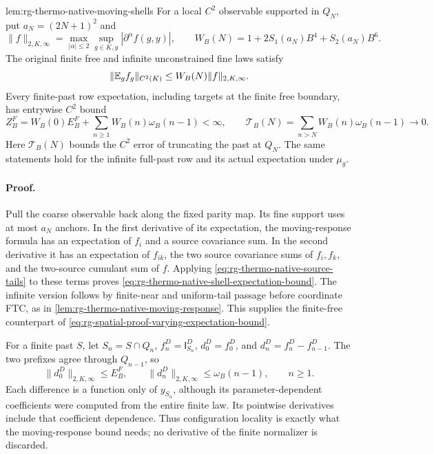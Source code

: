 {lem:rg-thermo-native-moving-shells}
For a local \(C^2\) observable supported in \(Q_N\), put
\(a_N=(2N+1)^2\) and
\begin{equation}
 \|f\|_{2,K,\infty}=\max_{|\alpha|\le2}\sup_{g\in K,y}
                                  |\partial^\alpha f(g,y)|,
 \qquad W_B(N)=1+2S_1(a_N)B^4+S_2(a_N)B^6.
 \label{eq:rg-thermo-native-shell-response-weight}
\end{equation}
The original finite free and infinite unconstrained fine laws satisfy
\begin{equation}
 \|\mathbb E_gf_g\|_{C^2(K)}\le W_B(N)\|f\|_{2,K,\infty}.
 \label{eq:rg-thermo-native-shell-expectation-bound}
\end{equation}
Every finite-past row expectation, including targets at the finite free
boundary, has entrywise \(C^2\) bound
\begin{equation}
 Z_B^F=W_B(0)E_B^F+\sum_{n\ge1}W_B(n)\omega_B(n-1)<\infty,
 \qquad
 \mathcal T_B(N)=\sum_{n>N}W_B(n)\omega_B(n-1)\longrightarrow0.
 \label{eq:rg-thermo-native-shell-tail}
\end{equation}
Here \(\mathcal T_B(N)\) bounds the \(C^2\) error of truncating the
past at \(Q_N\). The same statements hold for the infinite full-past
row and its actual expectation under \(\mu_g\).\thermoestablishedstatus


\paragraph{Proof.}
Pull the coarse observable back along the fixed parity map. Its fine
support uses at most \(a_N\) anchors. In the first derivative of its
expectation, the moving-response formula has an expectation of \(f_i\)
and a source covariance sum. In the second derivative it has an
expectation of \(f_{ik}\), the two source covariance sums of \(f_i,f_k\),
and the two-source cumulant sum of \(f\). Applying
\cref{eq:rg-thermo-native-source-tails} to these terms proves
\cref{eq:rg-thermo-native-shell-expectation-bound}. The infinite version
follows by finite-near and uniform-tail passage before coordinate FTC,
as in \cref{lem:rg-thermo-native-moving-response}. This supplies the
finite-free counterpart of
\cref{eq:rg-spatial-proof-varying-expectation-bound}.

For a finite past \(S\), let \(S_n=S\cap Q_n\),
\(f_n^D=\mathsf I^D_{S_n}\),
\(d_0^D=f_0^D\), and \(d_n^D=f_n^D-f_{n-1}^D\). The two prefixes
agree through \(Q_{n-1}\), so
\begin{equation}
 \|d_0^D\|_{2,K,\infty}\le E_B^F,\qquad
 \|d_n^D\|_{2,K,\infty}\le\omega_B(n-1),\qquad n\ge1.
 \label{eq:rg-thermo-native-shell-differences}
\end{equation}
Each difference is a function only of \(y_{S_n}\), although its
parameter-dependent coefficients were computed from the entire finite
law. Its pointwise derivatives include that coefficient dependence.
Thus configuration locality is exactly what the moving-response bound
needs; no derivative of the finite normalizer is discarded.

